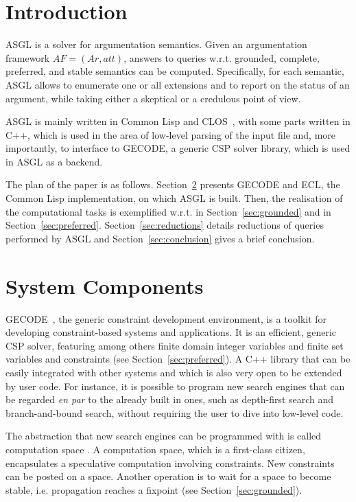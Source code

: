 \documentclass[runningheads,a4paper]{llncs}
\begin{document}
\section{Introduction}\label{sec:introduction}

ASGL is a solver for argumentation semantics. Given an argumentation
framework $AF = (Ar, att)$, answers to queries w.r.t. grounded,
complete, preferred, and stable semantics can be
computed. Specifically, for each semantic, ASGL allows to enumerate
one or all extensions and to report on the status of an argument,
while taking either a skeptical or a credulous point of view.

ASGL is mainly written in Common Lisp and CLOS~\cite{Steele:1990:CLL},
with some parts written in C++, which is used in the area of low-level
parsing of the input file and, more importantly, to interface to
GECODE, a generic CSP solver library, which is used in ASGL as a
backend.

The plan of the paper is as follows. Section~\ref{sec:components}
presents GECODE and ECL, the Common Lisp implementation, on which ASGL
is built. Then, the realisation of the computational tasks is
exemplified w.r.t. \grsem{} in Section~\ref{sec:grounded} and
\prsem{} in Section~\ref{sec:preferred}. Section~\ref{sec:reductions}
details reductions of queries performed by ASGL and
Section~\ref{sec:conclusion} gives a brief conclusion.

\section{System Components}\label{sec:components}

GECODE~\cite{gecode}, the generic constraint development environment,
is a toolkit for developing constraint-based systems and
applications. It is an efficient, generic CSP solver, featuring among
others finite domain integer variables and finite set variables and
constraints (see Section~\ref{sec:preferred}). A C++ library that can
be easily integrated with other systems and which is also very open to
be extended by user code. For instance, it is possible to program new
search engines that can be regarded \textit{en par} to the already
built in ones, such as depth-first search and branch-and-bound search,
without requiring the user to dive into low-level code.

The abstraction that new search engines can be programmed with is
called computation space \cite{Engines:97}. A computation space, which
is a first-class citizen, encapsulates a speculative computation
involving constraints. New constraints can be posted on a
space. Another operation is to wait for a space to become stable,
i.e. propagation reaches a fixpoint (see Section~\ref{sec:grounded}).
\end{document}
